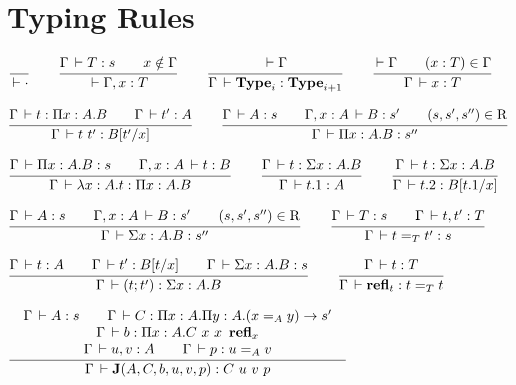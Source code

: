 \documentclass[a4paper,english]{lipics-utf8x}
\begin{document}
  \section{Typing Rules}

  \begin{center}
  \(
    \ru{}{\der \cdot}
    \qquad
    \ru{\Gamma \der T : s \qquad
        x \notin \Gamma
      }{\der \Gamma, x : T}
    \qquad
    \ru{\der \Gamma
      }{\Gamma \der \Type_i : \Type_{i+1}}
    \qquad
    \ru{\der \Gamma \qquad
        (x : T) \in \Gamma
      }{\Gamma \der x : T}
  \)
  \end{center}

  \begin{center}
  \(
    \ru{\Gamma \der t : \Pi x:A.B \qquad
        \Gamma \der t' : A
      }{\Gamma \der t\ t' : B[t'/x]}
    \qquad
    \ru{\Gamma \der A : s \qquad
        \Gamma, x:A \der B : s' \qquad
        (s,s',s'') \in \R
      }{\Gamma \der \Pi x:A.B : s''}
  \)
  \end{center}

  \begin{center}
  \(
    \ru{\Gamma \der \Pi x:A.B : s \qquad
        \Gamma, x:A \der t : B
      }{\Gamma \der \lambda x:A.t : \Pi x:A.B}
    \qquad
    \ru{\Gamma \der t : \Sigma x:A.B
      }{\Gamma \der t.1 : A}
    \qquad
    \ru{\Gamma \der t : \Sigma x:A.B
      }{\Gamma \der t.2 : B[t.1/x]}
  \)
  \end{center}

  \begin{center}
  \(
    \ru{\Gamma \der A : s \qquad
        \Gamma, x:A \der B : s' \qquad
        (s,s',s'') \in \R
      }{\Gamma \der \Sigma x:A.B : s''}
    \qquad
    \ru{\Gamma \der T : s \qquad
        \Gamma \der t,t' : T
      }{\Gamma \der t =_T t' : s}
  \)
  \end{center}

  \begin{center}
  \(
    \ru{\Gamma \der t : A \qquad
        \Gamma \der t' : B[t/x] \qquad
        \Gamma \der \Sigma x:A.B : s
      }{\Gamma \der (t;t') : \Sigma x:A.B}
    \qquad
    \ru{\Gamma \der t : T
      }{\Gamma \der \refl_t : t =_T t}
  \)
  \end{center}

  \begin{center}
  \(
    \tru{\Gamma \der A : s \qquad
         \Gamma \der C : \Pi x:A. \Pi y:A. (x =_A y) \to s'
       }{\Gamma \der b : \Pi x:A. C\ x\ x\ \refl_x
       }{\Gamma \der u, v : A \qquad
         \Gamma \der p : u =_A v
       }{\Gamma \der \J (A,C,b,u,v,p) : C\ u\ v\ p}
  \)
  \end{center}
\end{document}
